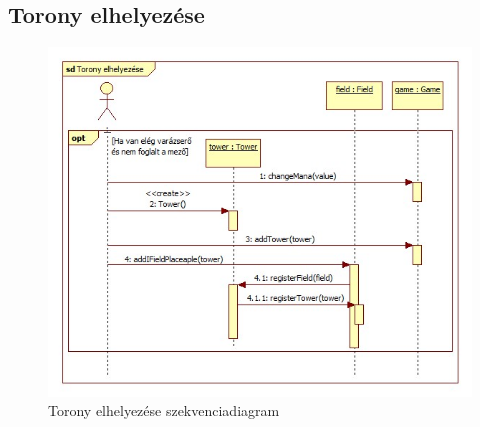 \subsection{Torony elhelyezése}
\begin{figure}[H]
\begin{center}
\includegraphics[width=17cm]{chapters/chapter04/images/Torony_elhelyezese.jpg}
\caption{Torony elhelyezése szekvenciadiagram}
\label{fig:Torony_elhelyezése}
\end{center}
\end{figure}

